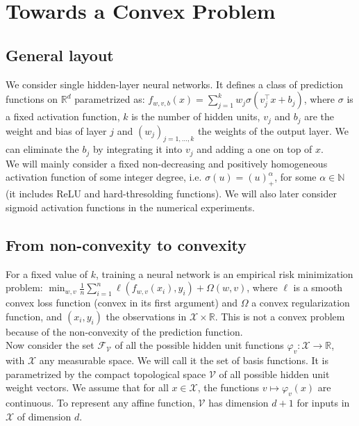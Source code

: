 \documentclass[a4paper, 11pt]{scrartcl}
\begin{document}
{\section{Towards a Convex Problem}

\subsection{General layout}

We consider single hidden-layer neural networks. It defines a class of prediction functions on $\mathbb{R}^d$ parametrized as: $f_{w, v, b}(x) =\sum_{j=1}^k w_j \sigma(v_j^\top x + b_j)$, where $\sigma$ is a fixed activation function, $k$ is the number of hidden units, $v_j$ and $b_j$ are the weight and bias of layer $j$ and $(w_j)_{j=1,...,k}$ the weights of the output layer. We can eliminate the $b_j$ by integrating it into $v_j$ and adding a one on top of $x$.\\

We will mainly consider a fixed non-decreasing and positively homogeneous  activation function of some integer degree, i.e. $\sigma(u) = (u)^\alpha_+$, for some $\alpha \in \mathbb{N}$ (it includes ReLU and hard-thresolding functions). We will also later consider sigmoid activation functions in the numerical experiments.

\subsection{From non-convexity to convexity}

For a fixed value of $k$, training a neural network is an empirical risk minimization problem: $\min_{w, v} \frac{1}{n} \sum_{i=1}^n \ell(f_{w, v}(x_i), y_i) + \Omega(w, v)$, where $\ell$ is a smooth convex loss function (convex in its first argument) and $\Omega$ a convex regularization function, and $(x_i, y_i)$ the observations in $\mathcal{X} \times \mathbb{R}$. This is not a convex problem because of the non-convexity of the prediction function.\\

Now consider the set $\mathcal{F}_\mathcal{V}$ of all the possible hidden unit functions $\varphi_v : \mathcal{X} \rightarrow \mathbb{R}$, with $\mathcal{X}$ any measurable space. We will call it the set of basis functions. It is parametrized by the compact topological space $\mathcal{V}$ of all possible hidden unit weight vectors. We assume that for all $x \in \mathcal{X}$, the functions $v \mapsto \varphi_v(x)$ are continuous. To represent any affine function, $\mathcal{V}$ has dimension $d + 1$ for inputs in $\mathcal{X}$ of dimension $d$.

}
\end{document}
